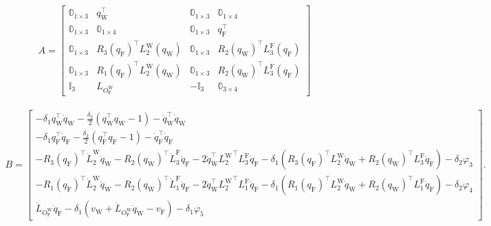 \begin{align}
\label{eq:A_contraint}
    A = \begin{bmatrix}
            \mathbb{0}_{1 \times 3} & q_{\text{W}}^\top & \mathbb{0}_{1 \times 3} & \mathbb{0}_{1 \times 4}\\
            \mathbb{0}_{1 \times 3} & \mathbb{0}_{1 \times 4} & \mathbb{0}_{1 \times 3} & q_{\text{F}}^\top\\
            \mathbb{0}_{1 \times 3} & R_{3}(q_{\text{F}})^\top L_{2}^{\text{W}}( q_{\text{W}} ) & \mathbb{0}_{1 \times 3} & R_{2}(q_{\text{W}})^\top L_{3}^{\text{F}}( q_{\text{F}} ) \\
            \mathbb{0}_{1 \times 3} & R_{1}(q_{\text{F}})^\top L_{2}^{\text{W}}( q_{\text{W}} ) & \mathbb{0}_{1 \times 3} & R_{2}(q_{\text{W}})^\top L_{3}^{\text{F}}( q_{\text{F}} ) \\
            \mathbb{I}_{3} & L_{O_{\text{F}}^{\text{W}}} & -\mathbb{I}_{3} & \mathbb{0}_{3 \times 4}
        \end{bmatrix}
\end{align}

\begin{align}
    \label{eq:b_contraint}
    B = \begin{bmatrix}
            -\delta_{1} q_{\text{W}}^\top \dot{q}_{\text{W}} - \frac{\delta_{2}}{2} (q_{\text{W}}^\top q_{\text{W}} -1) - \dot{q}_{\text{W}}^\top \dot{q}_{\text{W}} \\
            -\delta_{1} q_{\text{F}}^\top \dot{q}_{\text{F}} - \frac{\delta_{2}}{2} (q_{\text{F}}^\top q_{\text{F}} -1) - \dot{q}_{\text{F}}^\top \dot{q}_{\text{F}} \\
            -R_{3}(q_{\text{F}})^\top \dot{L}_{2}^{\text{W}}\dot{q}_{\text{W}} - R_{2}(q_{\text{W}})^\top \dot{L}_{3}^{\text{F}} \dot{q}_{\text{F}} - 2\dot{q}_{\text{W}}^\top {L_{2}^{\text{W}}}^\top L_{3}^{\text{F}} \dot{q}_{\text{F}} - \delta_{1}(R_{3}(q_{\text{F}})^\top L_{2}^{\text{W}}\dot{q}_{\text{W}} +  R_{2}(q_{\text{W}})^\top L_{3}^{\text{F}} \dot{q}_{\text{F}} ) - \delta_{2}\varphi_{3}\\
            -R_{1}(q_{\text{F}})^\top \dot{L}_{2}^{\text{W}}\dot{q}_{\text{W}} - R_{2}(q_{\text{W}})^\top \dot{L}_{1}^{\text{F}} \dot{q}_{\text{F}} - 2\dot{q}_{\text{W}}^\top {L_{2}^{\text{W}}}^\top L_{1}^{\text{F}} \dot{q}_{\text{F}} - \delta_{1}(R_{1}(q_{\text{F}})^\top L_{2}^{\text{W}}\dot{q}_{\text{W}} +  R_{2}(q_{\text{W}})^\top L_{1}^{\text{F}} \dot{q}_{\text{F}} ) - \delta_{2} \varphi_{4}\\
            \dot{L}_{O_{\text{F}}^{\text{W}}} \dot{q}_{\text{F}}  - \delta_{1}( v_{\text{W}} + \dot{L}_{O_{\text{F}}^{\text{W}}} \dot{q}_{\text{W}} - v_{\text{F}}) - \delta_{1}\varphi_{5}
        \end{bmatrix}.
\end{align}

